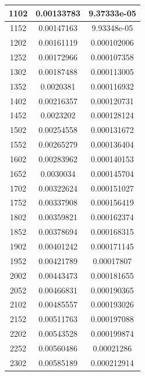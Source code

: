 \documentclass{article}
\begin{document}
\begin{longtable}{|c|c|c|}
		1102	&  0.00133783 	 &  9.37333e-05  \\ \hline                  
		1152	&  0.00147163 	 &  9.93348e-05  \\ \hline                  
		1202	&  0.00161119 	 &  0.000102006  \\ \hline                  
		1252	&  0.00172966 	 &  0.000107358  \\ \hline                  
		1302	&  0.00187488 	 &  0.000113005  \\ \hline                  
		1352	&  0.0020381  	 &  0.000116932  \\ \hline                  
		1402	&  0.00216357 	 &  0.000120731  \\ \hline                  
		1452	&  0.0023202  	 &  0.000128124  \\ \hline                  
		1502	&  0.00254558 	 &  0.000131672  \\ \hline                  
		1552	&  0.00265279 	 &  0.000136404  \\ \hline                  
		1602	&  0.00283962 	 &  0.000140153  \\ \hline                  
		1652	&  0.0030034  	 &  0.000145704  \\ \hline                  
		1702	&  0.00322624 	 &  0.000151027  \\ \hline                  
		1752	&  0.00337908 	 &  0.000156419  \\ \hline                  
		1802	&  0.00359821 	 &  0.000162374  \\ \hline                  
		1852	&  0.00378694 	 &  0.000168315  \\ \hline                  
		1902	&  0.00401242 	 &  0.000171145  \\ \hline                  
		1952	&  0.00421789 	 &  0.00017807   \\ \hline                 
		2002	&  0.00443473 	 &  0.000181655  \\ \hline                  
		2052	&  0.00466831 	 &  0.000190365  \\ \hline                  
		2102	&  0.00485557 	 &  0.000193026  \\ \hline                  
		2152	&  0.00511763 	 &  0.000197088  \\ \hline                  
		2202	&  0.00543528 	 &  0.000199874  \\ \hline                  
		2252	&  0.00560486 	 &  0.00021286   \\ \hline                 
		2302	&  0.00585189 	 &  0.000212914  \\ \hline                  

\end{longtable}
\end{document}

